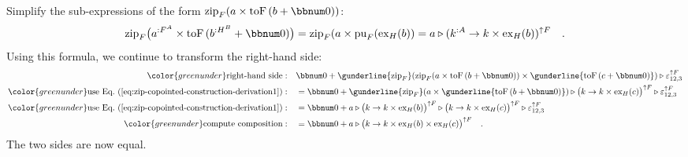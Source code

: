 Simplify the sub-expressions of the form $\text{zip}_{F}(a\times\text{toF}\left(b+\bbnum 0\right))$:
\begin{equation}
\text{zip}_{F}\big(a^{:F^{A}}\times\text{toF}\,(b^{:H^{B}}+\bbnum 0)\big)=\text{zip}_{F}(a\times\text{pu}_{F}(\text{ex}_{H}(b))=a\triangleright(k^{:A}\rightarrow k\times\text{ex}_{H}(b))^{\uparrow F}\quad.\label{eq:zip-copointed-construction-derivation1}
\end{equation}
Using this formula, we continue to transform the right-hand side:
\begin{align*}
{\color{greenunder}\text{right-hand side}:}\quad & \bbnum 0+\gunderline{\text{zip}_{F}}(\text{zip}_{F}(a\times\text{toF}\left(b+\bbnum 0\right))\times\gunderline{\text{toF}\left(c+\bbnum 0\right)})\triangleright\varepsilon_{12,3}^{\uparrow F}\\
{\color{greenunder}\text{use Eq.~(\ref{eq:zip-copointed-construction-derivation1})}:}\quad & =\bbnum 0+\gunderline{\text{zip}_{F}}(a\times\gunderline{\text{toF}\left(b+\bbnum 0\right)})\triangleright\big(k\rightarrow k\times\text{ex}_{H}(c)\big)^{\uparrow F}\triangleright\varepsilon_{12,3}^{\uparrow F}\\
{\color{greenunder}\text{use Eq.~(\ref{eq:zip-copointed-construction-derivation1})}:}\quad & =\bbnum 0+a\triangleright\big(k\rightarrow k\times\text{ex}_{H}(b)\big)^{\uparrow F}\triangleright\big(k\rightarrow k\times\text{ex}_{H}(c)\big)^{\uparrow F}\triangleright\varepsilon_{12,3}^{\uparrow F}\\
{\color{greenunder}\text{compute composition}:}\quad & =\bbnum 0+a\triangleright\big(k\rightarrow k\times\text{ex}_{H}(b)\times\text{ex}_{H}(c)\big)^{\uparrow F}\quad.
\end{align*}
The two sides are now equal. 

